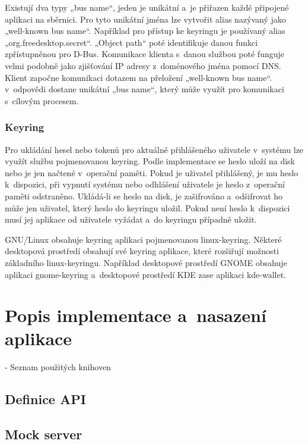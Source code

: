 Existují dva typy „bus name“, jeden je unikátní a je přiřazen každé připojené aplikaci na sběrnici. Pro tyto unikátní jména lze vytvořit alias nazývaný jako
„well-known bus name“. Například pro přístup ke keyringu je používaný alias „org.freedesktop.secret“. „Object path“ poté identifikuje danou funkci zpřístupněnou 
pro D-Bus. Komunikace klienta s danou službou poté funguje velmi podobně jako zjišťování IP adresy z doménového jména pomocí DNS. Klient započne komunikaci dotazem
na přeložení „well-known bus name“. v odpovědi dostane unikátní „bus name“, který může využít pro komunikaci s cílovým procesem.\cite{DBus}

\subsection{Keyring}

Pro ukládání hesel nebo tokenů pro aktuálně přihlášeného uživatele v systému lze využít službu pojmenovanou keyring. Podle implementace se heslo uloží na disk
nebo je jen načtené v operační paměti. Pokud je uživatel přihlášený, je mu heslo k dispozici, při vypnutí systému nebo odhlášení uživatele je heslo z operační paměti
odstraněno. Ukládá-li se heslo na disk, je zašifrováno a odšifrovat ho může jen uživatel, který heslo do keyringu uložil. Pokud není heslo k dispozici musí jej aplikace 
od uživatele vyžádat a do keyringu případně uložit.\cite{Keyring}

GNU/Linux obsahuje keyring aplikaci pojmenovanou linux-keyring. Některé desktopová prostředí obsahují své keyring aplikace, které rozšiřují možnosti základního linux-keyringu.
Například desktopové prostředí GNOME obsahuje aplikaci gnome-keyring a desktopové prostředí KDE zase aplikaci kde-wallet.\cite{Keyring}

\chapter{Popis implementace a nasazení aplikace}

- Seznam použitých knihoven

\section{Definice API}
\section{Mock server}
